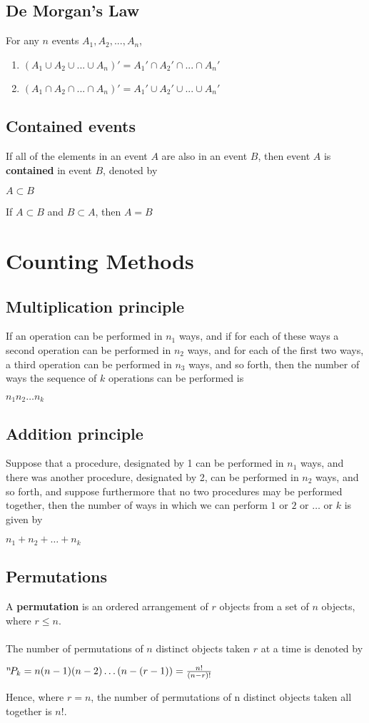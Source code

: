 \documentclass[a4paper]{article}
\begin{document}
\subsection{De Morgan's Law}
For any $n$ events $A_1, A_2, ..., A_n$,
\begin{enumerate}
	\item $(A_1 \cup A_2 \cup ... \cup A_n)' = A_1' \cap A_2' \cap ... \cap A_n'$
	\item $(A_1 \cap A_2 \cap ... \cap A_n)' = A_1' \cup A_2' \cup ... \cup A_n'$
\end{enumerate}
\subsection{Contained events}
If all of the elements in an event $A$ are also in an event $B$, then event $A$ is \textbf{contained} in event $B$, denoted by
\begin{center}
	$A \subset B$
\end{center}
If $A \subset B$ and $B \subset A$, then $A=B$

\section{Counting Methods}
\subsection{Multiplication principle}
If an operation can be performed in $n_1$ ways, and if for each of these ways a second operation can be performed in $n_2$ ways, and for each of the first two ways, a third operation can be performed in $n_3$ ways, and so forth, then the number of ways the sequence of $k$ operations can be performed is
\begin{center}
	$n_1n_2\dots n_k$
\end{center}
\subsection{Addition principle}
Suppose that a procedure, designated by 1 can be performed in $n_1$ ways, and there was another procedure, designated by 2, can be performed in $n_2$ ways, and so forth, and suppose furthermore that no two procedures may be performed together, then the number of ways in which we can perform $1$ or $2$ or $\dots$ or $k$ is given by
\begin{center}
	$n_1 + n_2 + \dots + n_k$
\end{center}
\subsection{Permutations}
A \textbf{permutation} is an ordered arrangement of $r$ objects from a set of $n$ objects, where $r \le n$.\\ \\
The number of permutations of $n$ distinct objects taken $r$ at a time is denoted by 
\begin{center}
	${}^{n}\!P_{k} = n(n-1)(n-2)\dots (n-(r-1)) = \frac{n!}{(n-r)!}$
\end{center}
Hence, where $r=n$, the number of permutations of n distinct objects taken all together is $n!$.\\
\end{document}
